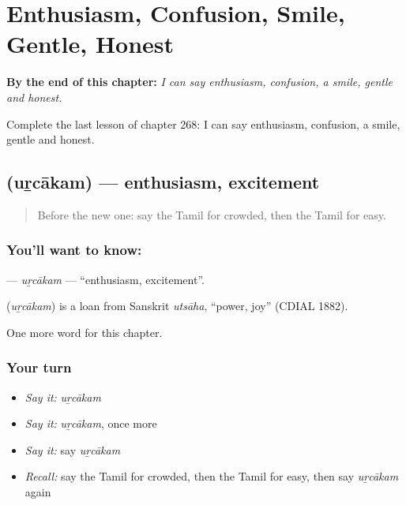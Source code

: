 
\chapter{Enthusiasm, Confusion, Smile, Gentle, Honest}
\label{ch:ta-enthusiasm-confusion-smile-gentle-honest}

\begin{chapteropening}
\textbf{By the end of this chapter:} \emph{I can say enthusiasm, confusion, a smile, gentle and honest.}

Complete the last lesson of chapter 268: I can say enthusiasm, confusion, a smile, gentle and honest.
\end{chapteropening}

\section[\texorpdfstring{\ta{உற்சாகம்} (uṟcākam)}{உற்சாகம் (uṟcākam)}]{ (uṟcākam) — enthusiasm, excitement}

\label{lesson:TA-C268-urcakam}



\begin{quote}
Before the new one: say the Tamil for crowded, then the Tamil for easy.
\end{quote}

\subsection*{You'll want to know: }
\textbf{} — \emph{uṟcākam} — \textquotedblleft{}enthusiasm, excitement\textquotedblright{}.

\begin{cousinweb}
\textbf{} (\emph{uṟcākam}) is a loan from Sanskrit \emph{utsāha}, \textquotedblleft{}power, joy\textquotedblright{} (CDIAL 1882).
\end{cousinweb}

\begin{grammarlens}[title={What you've built}]
One more word for this chapter.
\end{grammarlens}

\subsection*{Your turn}
\begin{itemize}
\raggedright
  \item \emph{Say it:} \emph{uṟcākam}
  \item \emph{Say it:} \emph{uṟcākam}, once more
  \item \emph{Say it:} say \emph{uṟcākam}
  \item \emph{Recall:} say the Tamil for crowded, then the Tamil for easy, then say \emph{uṟcākam} again
\end{itemize}

